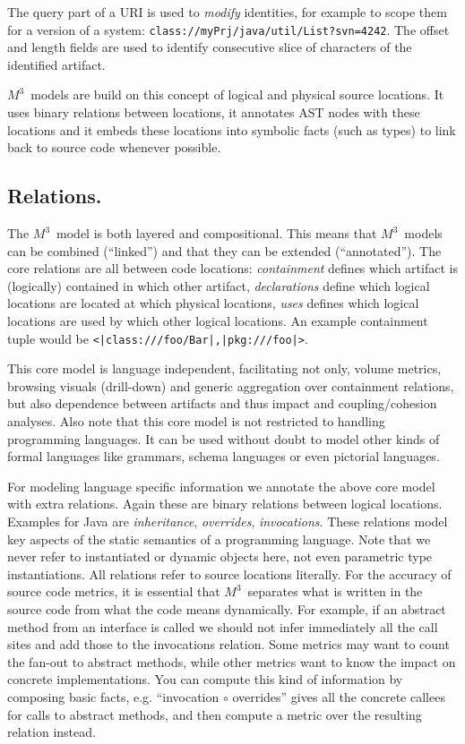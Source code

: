 \documentclass[conference]{IEEEtran}
\newcommand{\loc}[1]{\small{\texttt{#1}}}
\newcommand{\mthree}{\ensuremath{M^3}}
\begin{document}
The query part of a URI is used to \emph{modify} identities, for example to
scope them for a version of a system:
\loc{class://myPrj/java/util/List?svn=4242}. The offset and length fields are
used to identify consecutive slice of characters of the identified artifact.

\mthree\ models are build on this concept of logical and physical source
locations. It uses binary relations between locations, it annotates AST nodes
with these locations and it embeds these locations into symbolic facts (such
as types) to link back to source code whenever possible.

\subsection{Relations.} The \mthree\  model is both layered and compositional.
This means that \mthree\ models can be combined (``linked'') and that they can
be extended (``annotated''). The core relations are all between code
locations: \emph{containment} defines which artifact is (logically) contained
in which other artifact, \emph{declarations} define which logical locations
are located at which physical locations, \emph{uses} defines which logical
locations are used by which other logical locations. An example containment
tuple would be \loc{<|class:///foo/Bar|,|pkg:///foo|>}.

This core model is language independent, facilitating not only, volume
metrics, browsing visuals (drill-down) and generic aggregation over
containment relations, but also dependence between artifacts and thus impact
and coupling/cohesion analyses. Also note that this core model is not
restricted to handling programming languages. It can be used without doubt to
model other kinds of formal languages like grammars, schema languages or even
pictorial languages.

For modeling language specific information we annotate the above core model
with extra relations. Again these are binary relations between logical
locations. Examples for Java are \emph{inheritance}, \emph{overrides},
\emph{invocations}. These relations model key aspects of the static semantics
of a programming language. Note that we never refer to instantiated or dynamic
objects here, not even parametric type instantiations. All relations refer to
source locations literally. For the accuracy of source code metrics, it is
essential that \mthree\  separates what is written in the source code from
what the code means dynamically. For example, if an abstract method from an
interface is called we should not infer immediately all the call sites and add
those to the invocations relation. Some metrics may want to count the fan-out
to abstract methods, while other metrics want to know the impact on concrete
implementations. You can compute this kind of information by composing basic
facts, e.g. ``invocation $\circ$ overrides'' gives all the concrete callees
for calls to abstract methods, and then compute a metric over the resulting
relation instead.
\end{document}

